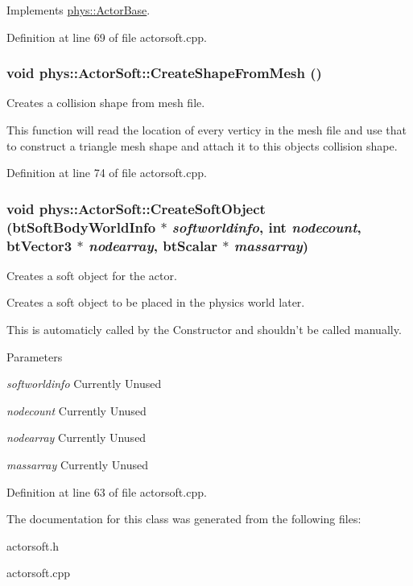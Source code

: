 Implements \hyperlink{classphys_1_1ActorBase_ac5d4ad5a634b16000742f506ed5957fb}{phys::ActorBase}.



Definition at line 69 of file actorsoft.cpp.

\hypertarget{classphys_1_1ActorSoft_a51d78e0f503c3c815511c3d246b426ae}{
\subsubsection[{CreateShapeFromMesh}]{\setlength{\rightskip}{0pt plus 5cm}void phys::ActorSoft::CreateShapeFromMesh ()}}
\label{d4/d23/classphys_1_1ActorSoft_a51d78e0f503c3c815511c3d246b426ae}


Creates a collision shape from mesh file. 

This function will read the location of every verticy in the mesh file and use that to construct a triangle mesh shape and attach it to this objects collision shape. 

Definition at line 74 of file actorsoft.cpp.

\hypertarget{classphys_1_1ActorSoft_a04c98bb0ab9ed7c1dfc3435d49403ef4}{
\subsubsection[{CreateSoftObject}]{\setlength{\rightskip}{0pt plus 5cm}void phys::ActorSoft::CreateSoftObject (btSoftBodyWorldInfo $\ast$ {\em softworldinfo}, \/  int {\em nodecount}, \/  btVector3 $\ast$ {\em nodearray}, \/  btScalar $\ast$ {\em massarray})}}
\label{d4/d23/classphys_1_1ActorSoft_a04c98bb0ab9ed7c1dfc3435d49403ef4}


Creates a soft object for the actor. 

Creates a soft object to be placed in the physics world later. \par
 This is automaticly called by the Constructor and shouldn't be called manually. 
\begin{DoxyParams}{Parameters}
\item[{\em softworldinfo}]Currently Unused \item[{\em nodecount}]Currently Unused \item[{\em nodearray}]Currently Unused \item[{\em massarray}]Currently Unused \end{DoxyParams}


Definition at line 63 of file actorsoft.cpp.



The documentation for this class was generated from the following files:\begin{DoxyCompactItemize}
\item 
actorsoft.h\item 
actorsoft.cpp\end{DoxyCompactItemize}
